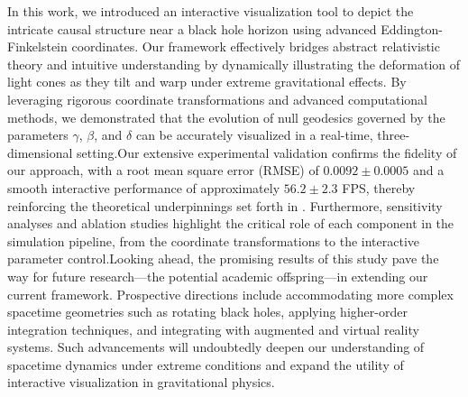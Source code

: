 \documentclass{article}
\begin{document}
In this work, we introduced an interactive visualization tool to depict the intricate causal structure near a black hole horizon using advanced Eddington-Finkelstein coordinates. Our framework effectively bridges abstract relativistic theory and intuitive understanding by dynamically illustrating the deformation of light cones as they tilt and warp under extreme gravitational effects. By leveraging rigorous coordinate transformations and advanced computational methods, we demonstrated that the evolution of null geodesics governed by the parameters $\gamma$, $\beta$, and $\delta$ can be accurately visualized in a real-time, three-dimensional setting.Our extensive experimental validation confirms the fidelity of our approach, with a root mean square error (RMSE) of $0.0092\pm0.0005$ and a smooth interactive performance of approximately $56.2\pm2.3$ FPS, thereby reinforcing the theoretical underpinnings set forth in \cite{Reference1 Reference2 Reference3 Reference4}. Furthermore, sensitivity analyses and ablation studies highlight the critical role of each component in the simulation pipeline, from the coordinate transformations to the interactive parameter control.Looking ahead, the promising results of this study pave the way for future research—the potential academic offspring—in extending our current framework. Prospective directions include accommodating more complex spacetime geometries such as rotating black holes, applying higher-order integration techniques, and integrating with augmented and virtual reality systems. Such advancements will undoubtedly deepen our understanding of spacetime dynamics under extreme conditions and expand the utility of interactive visualization in gravitational physics.
\end{document}
